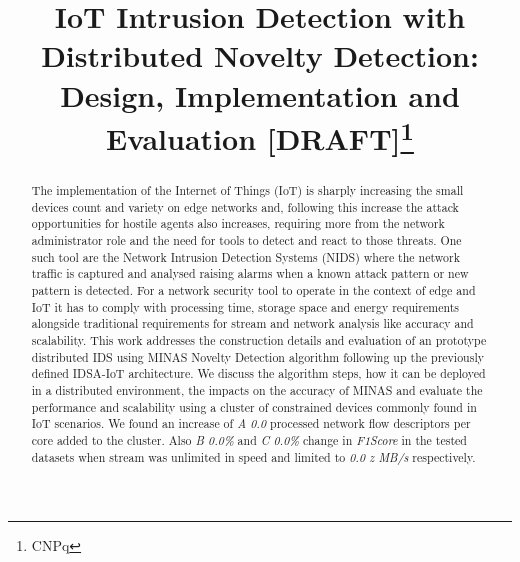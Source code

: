 \documentclass[conference]{IEEEtran}
\begin{document}
\title{IoT Intrusion Detection with Distributed Novelty Detection:
Design, Implementation and Evaluation [DRAFT]\thanks{CNPq}}

\author{
}

\maketitle

\begin{abstract}
  The implementation of the Internet of Things (IoT) is sharply increasing the small
  devices count and variety on edge networks and, following this increase the
  attack opportunities for hostile agents also increases, requiring more from
  the network administrator role and the need for tools to detect and react to those
  threats.
  One such tool are the Network Intrusion Detection Systems (NIDS) where the network
  traffic is captured and analysed raising alarms when a known attack pattern or
  new pattern is detected.
  For a network security tool to operate in the context of edge and
  IoT it has to comply with processing time, storage space and energy
  requirements alongside traditional requirements for stream and network
  analysis like accuracy and scalability.
  This work addresses the construction details and evaluation of an prototype
  distributed IDS using MINAS Novelty Detection algorithm
  following up the previously defined IDSA-IoT architecture.
  We discuss the algorithm steps, how it can be deployed in a distributed environment,
  the impacts on the accuracy of MINAS and evaluate the performance and scalability
  using a cluster of constrained devices commonly found in IoT scenarios.
  We found an increase of \textit{A 0.0} processed network flow descriptors per core
  added to the cluster. Also \textit{B 0.0\%} and \textit{C 0.0\%} change in
  \textit{F1Score} in the tested datasets when stream was unlimited in speed and
  limited to \textit{0.0 z MB/s} respectively.
\end{abstract}
\end{document}
